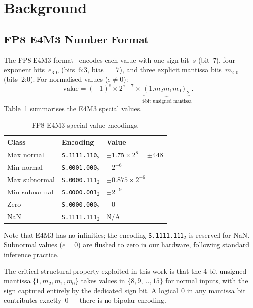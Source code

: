 \documentclass[conference]{IEEEtran}
\begin{document}
\section{Background}

\subsection{FP8 E4M3 Number Format}
\label{ssec:fp8}

The FP8 E4M3 format~\cite{b2,b3} encodes each value with one sign
bit~$s$ (bit~7), four exponent bits~$e_{3:0}$ (bits~6:3,
bias~$= 7$), and three explicit mantissa bits~$m_{2:0}$
(bits~2:0).  For normalised values ($e \neq 0$):
\begin{equation}
    \text{value} = (-1)^s \times 2^{e - 7} \times
    \underbrace{(1.m_2 m_1 m_0)_2}_{\text{4-bit unsigned mantissa}}.
    \label{eq:fp8_decode}
\end{equation}
Table~\ref{tab:fp8_special} summarises the E4M3 special values.

\begin{table}[htbp]
\centering
\caption{FP8 E4M3 special value encodings.}
\label{tab:fp8_special}
\footnotesize
\begin{tabular}{lll}
\toprule
Class & Encoding & Value \\
\midrule
Max normal     & \texttt{S.1111.110}$_2$ & $\pm 1.75 \times 2^{8} = \pm 448$ \\
Min normal     & \texttt{S.0001.000}$_2$ & $\pm 2^{-6}$ \\
Max subnormal  & \texttt{S.0000.111}$_2$ & $\pm 0.875 \times 2^{-6}$ \\
Min subnormal  & \texttt{S.0000.001}$_2$ & $\pm 2^{-9}$ \\
Zero           & \texttt{S.0000.000}$_2$ & $\pm 0$ \\
NaN            & \texttt{S.1111.111}$_2$ & N/A \\
\bottomrule
\end{tabular}
\end{table}

Note that E4M3 has no infinities; the encoding
\texttt{S.1111.111}$_2$ is reserved for NaN.  Subnormal values
($e = 0$) are flushed to zero in our hardware, following standard
inference practice.

The critical structural property exploited in this work is that the
4-bit unsigned mantissa $\{1, m_2, m_1, m_0\}$ takes values in
$\{8, 9, \ldots, 15\}$ for normal inputs, with the sign captured
entirely by the dedicated sign bit.  A logical~0 in any mantissa
bit contributes exactly~0 --- there is no bipolar encoding.
\end{document}
